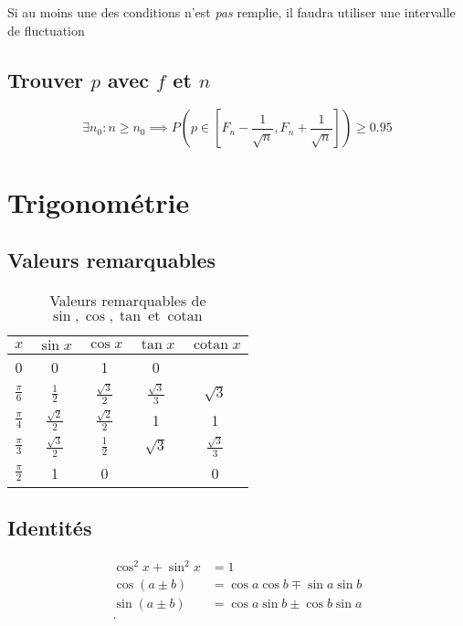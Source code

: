 \documentclass{article}
\newcommand{\cotan}{\operatorname{cotan}}
\newcommand{\et}{\:\text{et}\:}
\begin{document}
Si au moins une des conditions n'est \emph{pas} remplie,
il faudra utiliser une intervalle de fluctuation

\subsection{Trouver $p$ avec $f$ et $n$}
\[
	\exists n_0 : n \ge n_0 
	\implies P\left(p \in \left[ 
		F_n- \frac{1}{\sqrt{n} }, 
		F_n+\frac{1}{\sqrt{n} } 
	\right] \right) \ge 0.95
\] 

\newpage\section{Trigonométrie}

\subsection{Valeurs remarquables}
\begin{table}[h]
	\centering
	\caption{Valeurs remarquables de $\sin, \cos, \tan \et \cotan$}
	\label{tab:valeurs-remarquables-sin-cos-tan-cotan}
	\begin{tabular}{c | cccc}
$x$ & $\sin x$ & $\cos x$  & $\tan x$ & $\cotan x$ \\\hline
0 & 0 & 1 & 0 & \\
$\frac{\pi}{6}$ & $\frac{1}{2}$ & $ \frac{\sqrt{3} }{2} $ & $\frac{\sqrt{3} }{3}$  & $\sqrt{3}$\\
$\frac{\pi}{4}$ & $\frac{\sqrt{2} }{2}$ & $\frac{\sqrt{2} }{2}$ & 1 & 1 \\
$\frac{\pi}{3}$ & $\frac{\sqrt{3} }{2}$ & $\frac{1}{2}$ & $  \sqrt{3}  $ & $\frac{\sqrt{3} }{3}$ \\
$\frac{\pi}{2}$ & 1 & 0 & & 0 \\
	\end{tabular}
\end{table}

\subsection{Identités}

\begin{align*}
	\cos^2x+\sin^2x&= 1 \\
	\cos(a\pm b) &= \cos a \cos b \mp \sin a \sin b \\
	\sin(a\pm b) &= \cos a \sin b \pm \cos b \sin a \\
.\end{align*}
\end{document}
